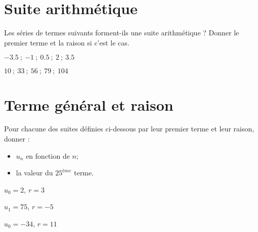 	\section{Suite arithmétique}
	Les séries de termes suivants forment-ils une suite arithmétique ? Donner le premier terme et la raison si c'est le cas.
	\begin{questions}
		
	
		\question[2] $\num{-3.5} \: ; \: \num{-1} \: ; \: \num{0.5}  \: ; \:  \num{2} \: ; \: \num{3.5}$ 
		\fillwithdottedlines{3cm}
		
		\question[2] $\num{10} \: ; \:  \num{33} \: ; \: \num{56} \: ; \: \num{79} \: ; \: \num{104}$ 
		\fillwithdottedlines{3cm}
		
	\end{questions}
	
	
\section{Terme général et raison}

Pour chacune des suites définies ci-dessous par leur premier terme et leur raison, donner :
\begin{itemize}
	\item $u_n$ en fonction de $n$;
	\item la valeur du $25^{ème}$ terme.
\end{itemize} 
\begin{questions}

	
	\question[2] $u_0 = 2$, $r= 3$
	
	\fillwithdottedlines{6cm}
	
	
	\question[2] $u_1 = 75$, $r= -5$
	
	\fillwithdottedlines{6cm}
	
	\question[2] $u_0 = -34$, $r=11$
	
	\fillwithdottedlines{6cm}
\end{questions}

